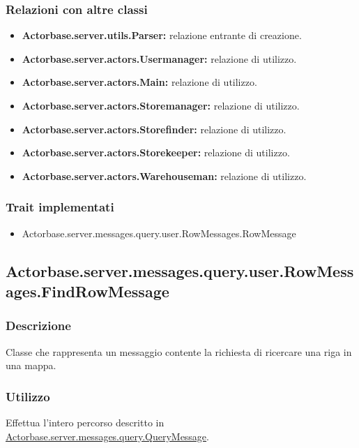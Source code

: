 \documentclass[a4paper]{article}
\begin{document}
			\subsubsection{Relazioni con altre classi}
				\begin{itemize}
					\item \textbf{Actorbase.server.utils.Parser:} relazione entrante di creazione.
					\item \textbf{Actorbase.server.actors.Usermanager:} relazione di utilizzo.
					\item \textbf{Actorbase.server.actors.Main:} relazione di utilizzo.
					\item \textbf{Actorbase.server.actors.Storemanager:} relazione di utilizzo.
					\item \textbf{Actorbase.server.actors.Storefinder:} relazione di utilizzo.
					\item \textbf{Actorbase.server.actors.Storekeeper:} relazione di utilizzo.
					\item \textbf{Actorbase.server.actors.Warehouseman:} relazione di utilizzo.
				\end{itemize}
			\subsubsection{Trait implementati}
				\begin{itemize}
					\item Actorbase.server.messages.query.user.RowMessages.RowMessage
				\end{itemize}
				
		\subsection{Actorbase.server.messages.query.user.RowMessages.FindRowMessage}
			\subsubsection{Descrizione}
				Classe che rappresenta un messaggio contente la richiesta di ricercare una riga in una mappa.
				
			\subsubsection{Utilizzo}
				Effettua l'intero percorso descritto in \hyperref[QueryMessage]{Actorbase.server.messages.query.QueryMessage}.
				
\end{document}
